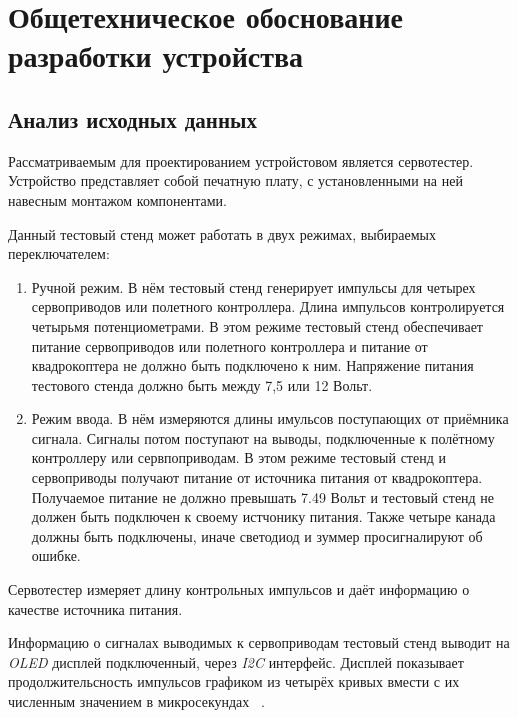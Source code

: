 
\section{Общетехническое обоснование разработки устройства}

\subsection{Анализ исходных данных}

Рассматриваемым для проектированием устройстовом является сервотестер.
Устройство представляет собой печатную плату, с установленными на ней
навесным монтажом компонентами.

Данный тестовый стенд может работать в двух режимах, выбираемых переключателем:
\begin{enumerate} 
  
\item Ручной режим. В нём тестовый стенд генерирует импульсы для
четырех сервоприводов или полетного контроллера. Длина импульсов
контролируется четырьмя потенциометрами. В этом режиме тестовый стенд
обеспечивает питание сервоприводов или полетного контроллера и питание
от квадрокоптера не должно быть подключено к ним. Напряжение питания
тестового стенда должно быть между 7,5 или 12 Вольт.
  
\item Режим ввода. В нём измеряются длины имульсов поступающих от
приёмника сигнала. Сигналы потом поступают на выводы, подключенные к
полётному контроллеру или сервпоприводам.  В этом режиме тестовый
стенд и сервоприводы получают питание от источника питания от
квадрокоптера. Получаемое питание не должно превышать 7.49 Вольт и
тестовый стенд не должен быть подключен к своему истчонику
питания. Также четыре канада должны быть подключены, иначе светодиод и
зуммер просигналируют об ошибке.

\end{enumerate}

Сервотестер измеряет длину контрольных импульсов и даёт информацию о
качестве источника питания.


Информацию о сигналах выводимых к сервоприводам тестовый стенд выводит
на \textit{OLED} дисплей подключенный, через \textit{I2C} интерфейс.
Дисплей показывает продолжительсность импульсов графиком из четырёх
кривых вмести с их численным значением в микросекундах
~\cite{Elector521}.

